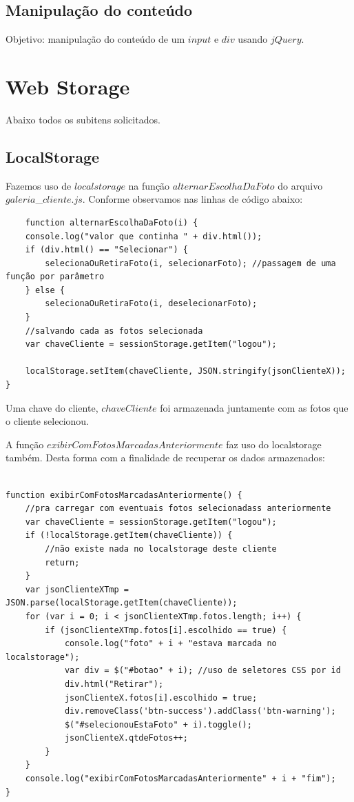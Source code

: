 \subsection{Manipulação do conteúdo}
	Objetivo: manipulação do conteúdo de um $input$ e $div$ usando $jQuery$.

\section{Web Storage } 
	Abaixo todos os subitens solicitados.
\subsection{LocalStorage}
	Fazemos uso de $localstorage$ na função $alternarEscolhaDaFoto$ do arquivo $galeria$\_$cliente.js$. Conforme observamos nas linhas de código abaixo:
	
\begin{lstlisting}
	function alternarEscolhaDaFoto(i) {
    console.log("valor que continha " + div.html());
    if (div.html() == "Selecionar") {
        selecionaOuRetiraFoto(i, selecionarFoto); //passagem de uma função por parâmetro
    } else {
        selecionaOuRetiraFoto(i, deselecionarFoto);
    }
    //salvando cada as fotos selecionada
    var chaveCliente = sessionStorage.getItem("logou");

    localStorage.setItem(chaveCliente, JSON.stringify(jsonClienteX));
}
	\end{lstlisting}
	Uma chave do cliente, $chaveCliente$ foi armazenada juntamente com as fotos que o cliente selecionou.
	
	A função $exibirComFotosMarcadasAnteriormente$ faz uso do localstorage também. Desta forma com a finalidade de recuperar os dados armazenados:
\begin{lstlisting}	
	
function exibirComFotosMarcadasAnteriormente() {
    //pra carregar com eventuais fotos selecionadass anteriormente
    var chaveCliente = sessionStorage.getItem("logou");
    if (!localStorage.getItem(chaveCliente)) {
        //não existe nada no localstorage deste cliente
        return;
    }
    var jsonClienteXTmp = JSON.parse(localStorage.getItem(chaveCliente));
    for (var i = 0; i < jsonClienteXTmp.fotos.length; i++) {
        if (jsonClienteXTmp.fotos[i].escolhido == true) {
            console.log("foto" + i + "estava marcada no localstorage");
            var div = $("#botao" + i); //uso de seletores CSS por id
            div.html("Retirar");
            jsonClienteX.fotos[i].escolhido = true;
            div.removeClass('btn-success').addClass('btn-warning');
            $("#selecionouEstaFoto" + i).toggle();
            jsonClienteX.qtdeFotos++;
        }
    }
    console.log("exibirComFotosMarcadasAnteriormente" + i + "fim");
}

	\end{lstlisting}
	
